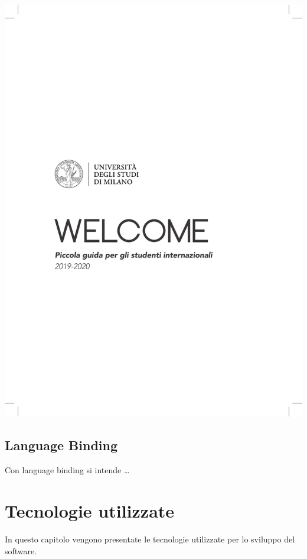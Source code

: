 \documentclass[12pt,italian]{report}
\begin{document}
\begin{center}
	\includegraphics{unimi}
\end{center}

\section{Language Binding}
\label{sec:languagebinding}

Con language binding si intende \dots


% 
% 

\chapter{Tecnologie utilizzate}
\label{cap2}

In questo capitolo vengono presentate le tecnologie utilizzate per lo sviluppo del software. 
\end{document}
